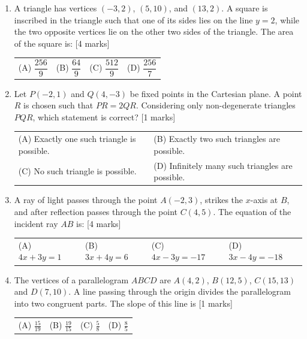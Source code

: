 \documentclass[11pt,a4paper]{article}
\begin{document}
\begin{enumerate}[resume]
{\begin{tabularx}{\linewidth}{X X}
\end{tabularx}}
\item A triangle has vertices \((-3,2)\), \((5,10)\), and \((13,2)\). A square is inscribed in the triangle such that one of its sides lies on the line \(y=2\), while the two opposite vertices lie on the other two sides of the triangle. The area of the square is: \hfill [4 marks]
{\renewcommand{\arraystretch}{1.8}
\begin{tabularx}{\linewidth}{X X X X}
(A) \quad \(\dfrac{256}{9}\) & (B) \quad \(\dfrac{64}{9}\) & (C) \quad \(\dfrac{512}{9}\) & (D) \quad \(\dfrac{256}{7}\) \\[10pt]
\end{tabularx}}
\item Let \(P(-2,1)\) and \(Q(4,-3)\) be fixed points in the Cartesian plane. A point \(R\) is chosen such that \(PR=2QR\). Considering only non-degenerate triangles \(PQR\), which statement is correct? \hfill [1 marks]
{\renewcommand{\arraystretch}{1.8}
\begin{tabularx}{\linewidth}{X X}
(A) \quad Exactly one such triangle is possible. & (B) \quad Exactly two such triangles are possible. \\[10pt]
(C) \quad No such triangle is possible. & (D) \quad Infinitely many such triangles are possible. \\[10pt]
\end{tabularx}}
\item A ray of light passes through the point \(A(-2,3)\), strikes the \(x\)-axis at \(B\), and after reflection passes through the point \(C(4,5)\). The equation of the incident ray \(AB\) is: \hfill [4 marks]
{\renewcommand{\arraystretch}{1.8}
\begin{tabularx}{\linewidth}{X X X X}
(A) \quad \(4x+3y=1\) & (B) \quad \(3x+4y=6\) & (C) \quad \(4x-3y=-17\) & (D) \quad \(3x-4y=-18\) \\[10pt]
\end{tabularx}}
\item The vertices of a parallelogram \(ABCD\) are \(A(4,2)\), \(B(12,5)\), \(C(15,13)\) and \(D(7,10)\). A line passing through the origin divides the parallelogram into two congruent parts. The slope of this line is \hfill [1 marks]
{\renewcommand{\arraystretch}{1.8}
\begin{tabularx}{\linewidth}{X X X X}
(A) \quad \(\frac{15}{19}\) & (B) \quad \(\frac{19}{15}\) & (C) \quad \(\frac{5}{8}\) & (D) \quad \(\frac{8}{5}\) \\[10pt]
\end{tabularx}}

\end{enumerate}
\end{document}
